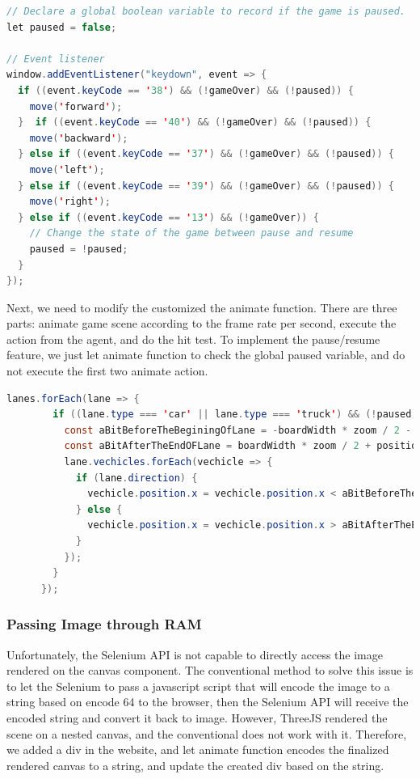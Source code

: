\documentclass{article}
\begin{document}
\begin{lstlisting}[language = Java]
// Declare a global boolean variable to record if the game is paused. 
let paused = false;

// Event listener
window.addEventListener("keydown", event => {
  if ((event.keyCode == '38') && (!gameOver) && (!paused)) {
    move('forward');
  }  if ((event.keyCode == '40') && (!gameOver) && (!paused)) {
    move('backward');
  } else if ((event.keyCode == '37') && (!gameOver) && (!paused)) {
    move('left');
  } else if ((event.keyCode == '39') && (!gameOver) && (!paused)) {
    move('right');
  } else if ((event.keyCode == '13') && (!gameOver)) {
    // Change the state of the game between pause and resume
    paused = !paused;
  }
});
\end{lstlisting}

Next, we need to modify the customized the animate function. There are three parts: animate game scene according to the frame rate per second, execute the action from the agent, and do the hit test. To implement the pause/resume feature, we just let animate function to check the global paused variable, and do not execute the first two animate action. 

\begin{lstlisting}[language = Java]
    lanes.forEach(lane => {
        if ((lane.type === 'car' || lane.type === 'truck') && (!paused)) {
          const aBitBeforeTheBeginingOfLane = -boardWidth * zoom / 2 - positionWidth * 2 * zoom;
          const aBitAfterTheEndOFLane = boardWidth * zoom / 2 + positionWidth * 2 * zoom;
          lane.vechicles.forEach(vechicle => {
            if (lane.direction) {
              vechicle.position.x = vechicle.position.x < aBitBeforeTheBeginingOfLane ? aBitAfterTheEndOFLane : vechicle.position.x -= lane.speed / 16 * delta;
            } else {
              vechicle.position.x = vechicle.position.x > aBitAfterTheEndOFLane ? aBitBeforeTheBeginingOfLane : vechicle.position.x += lane.speed / 16 * delta;
            }
          });
        }
      });
\end{lstlisting}

\subsubsection{Passing Image through RAM}
Unfortunately, the Selenium API is not capable to directly access the image rendered on the canvas component. The conventional method to solve this issue is to let the Selenium to pass a javascript script that will encode the image to a string based on encode 64 to the browser, then the Selenium API will receive the encoded string and convert it back to image. However, ThreeJS rendered the scene on a nested canvas, and the conventional does not work with it. Therefore, we added a div in the website, and let animate function encodes the finalized rendered canvas to a string, and update the created div based on the string. 
\end{document}
